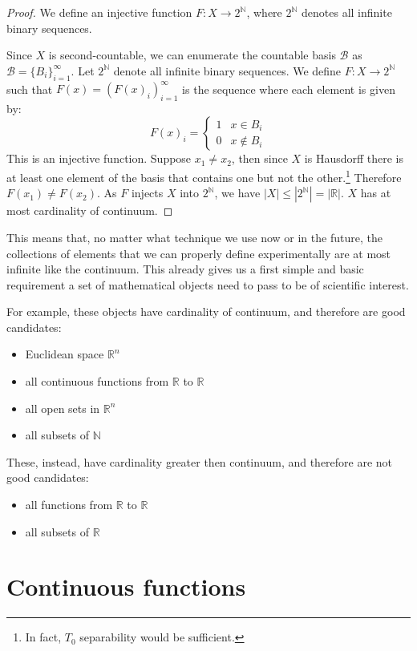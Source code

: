 \documentclass[11pt,letterpaper,fleqn]{memoir} %
\begin{document}
\begin{proof}
	We define an injective function $F:X\to2^{\mathbb{N}}$, where $2^{\mathbb{N}}$ denotes all infinite binary sequences.
	
	Since $X$ is second-countable, we can enumerate the countable basis $\mathcal{B}$ as $\mathcal{B} = \{B_i\}_{i=1}^{\infty}$. Let $2^{\mathbb{N}}$ denote all infinite binary sequences. We define $F:X\to2^{\mathbb{N}}$ such that $F(x) = (F(x)_i)_{i=1}^{\infty}$ is the sequence where each element is given by: 
	$$
	F(x)_i = 
	\begin{cases}
	1 & x\in B_i \\
	0 & x\notin B_i
	\end{cases}
	$$
	This is an injective function. Suppose $x_1 \neq x_2$, then since $X$ is Hausdorff there is at least one element of the basis that contains one but not the other.\footnote{In fact, $T_0$ separability would be sufficient.} Therefore $F(x_1) \neq F(x_2)$. As $F$ injects $X$ into $2^{\mathbb{N}}$, we have $|X| \leq |2^{\mathbb{N}}|=|\mathbb{R}|$. $X$ has at most cardinality of continuum.
\end{proof}

This means that, no matter what technique we use now or in the future, the collections of elements that we can properly define experimentally are at most infinite like the continuum. This already gives us a first simple and basic requirement a set of mathematical objects need to pass to be of scientific interest.

For example, these objects have cardinality of continuum, and therefore are good candidates:
\begin{itemize}
	\item Euclidean space $\mathbb{R}^n$
	\item all continuous functions from $\mathbb{R}$ to $\mathbb{R}$
	\item all open sets in $\mathbb{R}^n$
	\item all subsets of $\mathbb{N}$
\end{itemize}

These, instead, have cardinality greater then continuum, and therefore are not good candidates:
\begin{itemize}
	\item all functions from $\mathbb{R}$ to $\mathbb{R}$
	\item all subsets of $\mathbb{R}$
\end{itemize}


\section{Continuous functions}
\end{document}
